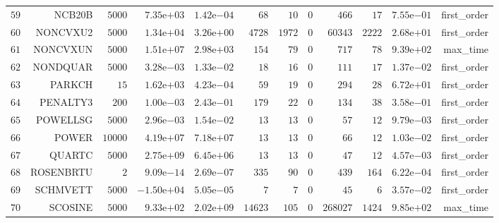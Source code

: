 \begin{longtable}{rrrrrrrrrrrr}
  \(    59\) & NCB20B & \(  5000\) & \( 7.35\)e\(+03\) & \( 1.42\)e\(-04\) & \(    68\) & \(    10\) & \(     0\) & \(   466\) & \(    17\) & \( 7.55\)e\(-01\) & first\_order \\
  \(    60\) & NONCVXU2 & \(  5000\) & \( 1.34\)e\(+04\) & \( 3.26\)e\(+00\) & \(  4728\) & \(  1972\) & \(     0\) & \( 60343\) & \(  2222\) & \( 2.68\)e\(+01\) & first\_order \\
  \(    61\) & NONCVXUN & \(  5000\) & \( 1.51\)e\(+07\) & \( 2.98\)e\(+03\) & \(   154\) & \(    79\) & \(     0\) & \(   717\) & \(    78\) & \( 9.39\)e\(+02\) & max\_time \\
  \(    62\) & NONDQUAR & \(  5000\) & \( 3.28\)e\(-03\) & \( 1.33\)e\(-02\) & \(    18\) & \(    16\) & \(     0\) & \(   111\) & \(    17\) & \( 1.37\)e\(-02\) & first\_order \\
  \(    63\) & PARKCH & \(    15\) & \( 1.62\)e\(+03\) & \( 4.23\)e\(-04\) & \(    59\) & \(    19\) & \(     0\) & \(   294\) & \(    28\) & \( 6.72\)e\(+01\) & first\_order \\
  \(    64\) & PENALTY3 & \(   200\) & \( 1.00\)e\(-03\) & \( 2.43\)e\(-01\) & \(   179\) & \(    22\) & \(     0\) & \(   134\) & \(    38\) & \( 3.58\)e\(-01\) & first\_order \\
  \(    65\) & POWELLSG & \(  5000\) & \( 2.96\)e\(-03\) & \( 1.54\)e\(-02\) & \(    13\) & \(    13\) & \(     0\) & \(    57\) & \(    12\) & \( 9.79\)e\(-03\) & first\_order \\
  \(    66\) & POWER & \( 10000\) & \( 4.19\)e\(+07\) & \( 7.18\)e\(+07\) & \(    13\) & \(    13\) & \(     0\) & \(    66\) & \(    12\) & \( 1.03\)e\(-02\) & first\_order \\
  \(    67\) & QUARTC & \(  5000\) & \( 2.75\)e\(+09\) & \( 6.45\)e\(+06\) & \(    13\) & \(    13\) & \(     0\) & \(    47\) & \(    12\) & \( 4.57\)e\(-03\) & first\_order \\
  \(    68\) & ROSENBRTU & \(     2\) & \( 9.09\)e\(-14\) & \( 2.69\)e\(-07\) & \(   335\) & \(    90\) & \(     0\) & \(   439\) & \(   164\) & \( 6.22\)e\(-04\) & first\_order \\
  \(    69\) & SCHMVETT & \(  5000\) & \(-1.50\)e\(+04\) & \( 5.05\)e\(-05\) & \(     7\) & \(     7\) & \(     0\) & \(    45\) & \(     6\) & \( 3.57\)e\(-02\) & first\_order \\
  \(    70\) & SCOSINE & \(  5000\) & \( 9.33\)e\(+02\) & \( 2.02\)e\(+09\) & \( 14623\) & \(   105\) & \(     0\) & \(268027\) & \(  1424\) & \( 9.85\)e\(+02\) & max\_time \\

\end{longtable}
